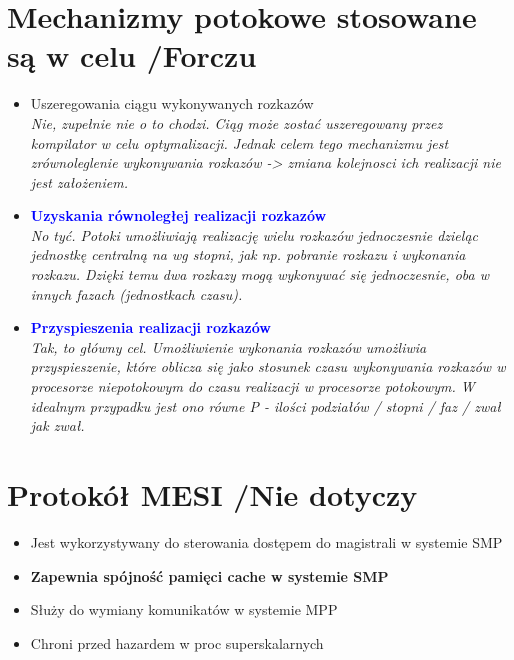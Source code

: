 \documentclass[a4paper,twoside]{article}
\begin{document}
\section{Mechanizmy potokowe stosowane są w celu {\small /Forczu}}
	\begin{itemize}
    \item Uszeregowania ciągu wykonywanych rozkazów\\
    {\small \emph{Nie, zupełnie nie o to chodzi. Ciąg może zostać uszeregowany przez kompilator w celu optymalizacji. Jednak celem tego mechanizmu jest zrównoleglenie wykonywania rozkazów -> zmiana kolejnosci ich realizacji nie jest założeniem.}}
    \item \textcolor{Blue}{\textbf{Uzyskania równoległej realizacji rozkazów}}\\
    {\small \emph{No tyć. Potoki umożliwiają realizację wielu rozkazów jednoczesnie dzieląc jednostkę centralną na wg stopni, jak np. pobranie rozkazu i wykonania rozkazu. Dzięki temu dwa rozkazy mogą wykonywać się jednoczesnie, oba w innych fazach (jednostkach czasu).}}
    \item \textcolor{Blue}{\textbf{Przyspieszenia realizacji rozkazów}}\\
    {\small \emph{Tak, to główny cel. Umożliwienie wykonania rozkazów umożliwia przyspieszenie, które oblicza się jako stosunek czasu wykonywania rozkazów w procesorze niepotokowym do czasu realizacji w procesorze potokowym. W idealnym przypadku jest ono równe \emph{P} - ilości podziałów / stopni / faz / zwał jak zwał.}}
    \end{itemize}

\section{Protokół MESI {\small /Nie dotyczy}}
	\begin{itemize}
    \item Jest wykorzystywany do sterowania dostępem do magistrali w systemie SMP
    \item \textbf{Zapewnia spójność pamięci cache w systemie SMP}
    \item Służy do wymiany komunikatów w systemie MPP
    \item Chroni przed hazardem w proc superskalarnych
    \end{itemize}
    
\end{document}
